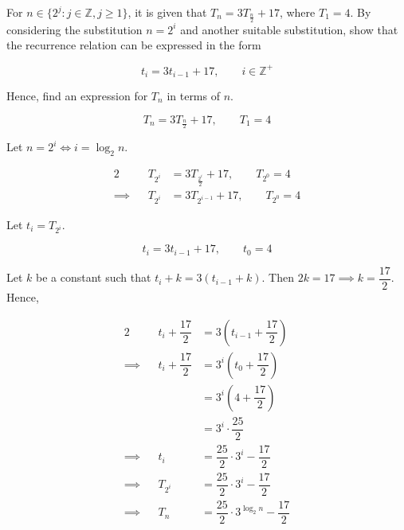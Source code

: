 \documentclass{echw}
\begin{document}
    \problem{}
        For $n \in \{2^j \colon j \in \mathbb{Z}, j \geq 1\}$, it is given that $T_n = 3T_{\tfrac{n}2} + 17$, where $T_1 = 4$. By considering the substitution $n = 2^i$ and another suitable substitution, show that the recurrence relation can be expressed in the form

        \begin{equation*}
            t_i = 3t_{i-1} + 17, \qquad i \in \mathbb{Z}^+
        \end{equation*}

        \noindent Hence, find an expression for $T_n$ in terms of $n$.

    \solution
        \begin{equation*}
            T_n = 3T_{\tfrac{n}2} + 17, \qquad T_1 = 4
        \end{equation*}

        Let $n = 2^i \iff i = \log_2{n}$.

        \begin{alignat*}{2}
            &&T_{2^i} &= 3T_{\tfrac{2^i}2} + 17, \qquad T_{2^0} = 4\\
            \implies&&T_{2^i} &= 3T_{2^{i-1}} + 17, \qquad T_{2^0} = 4
        \end{alignat*}

        Let $t_i = T_{2^i}$.

        \begin{equation*}
            t_i = 3t_{i-1} + 17, \qquad t_0 = 4
        \end{equation*}

        Let $k$ be a constant such that $t_i + k = 3(t_{i-1} + k)$. Then $2k = 17 \implies k = \dfrac{17}2$. Hence,

        \begin{alignat*}{2}
            &&t_i + \dfrac{17}2 &= 3\left(t_{i-1} + \dfrac{17}2\right)\\
            \implies&&t_i + \dfrac{17}2 &= 3^i \left(t_0 + \dfrac{17}2\right)\\
            && &= 3^i \left(4 + \dfrac{17}2\right)\\
            && &= 3^i \cdot \dfrac{25}2\\
            \implies&&t_i &= \dfrac{25}2 \cdot 3^i - \dfrac{17}2\\
            \implies&&T_{2^i} &= \dfrac{25}2 \cdot 3^i - \dfrac{17}2\\
            \implies&&T_n &= \dfrac{25}2 \cdot 3^{\log_2{n}} - \dfrac{17}2
        \end{alignat*}
\end{document}
